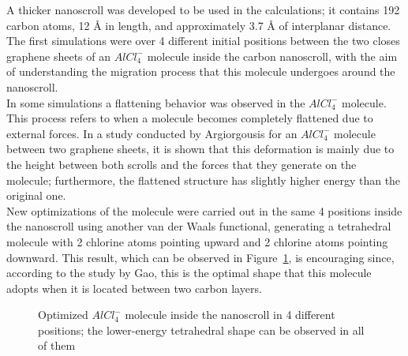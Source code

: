\documentclass[aps,twocolumn,secnumarabic,nobalancelastpage,amsmath,amssymb,
nofootinbib,floatfix]{revtex4}
\begin{document}
A thicker nanoscroll was developed to be used in the calculations; it contains 192 carbon atoms, 12 Å in length, and approximately 3.7 Å of interplanar distance.\\
The first simulations were over 4 different initial positions between the two closes graphene sheets of an \(AlCl_{4}^{-}\) molecule inside the carbon nanoscroll, with the aim of understanding the migration process that this molecule undergoes around the nanoscroll.\\ 
In some simulations a flattening behavior was observed in the \(AlCl_{4}^{-}\) molecule. This process refers to when a molecule becomes completely flattened due to external forces. In a study conducted by Argiorgousis \cite{agiorgousis2017role} for an \(AlCl_{4}^{-}\) molecule between two graphene sheets, it is shown that this deformation is mainly due to the height between both scrolls and the forces that they generate on the molecule; furthermore, the flattened structure has slightly higher energy than the original one.\\
New optimizations of the molecule were carried out in the same 4 positions inside the nanoscroll using another van der Waals functional, generating a tetrahedral molecule with 2 chlorine atoms pointing upward and 2 chlorine atoms pointing downward. This result, which can be observed in Figure~\ref{1}, is encouraging since, according to the study by Gao\cite{gao2017understanding}, this is the optimal shape that this molecule adopts when it is located between two carbon layers.\\

\begin{figure}[htbp]
\centering
\caption{Optimized \(AlCl_{4}^{-}\) molecule inside the nanoscroll in 4 different positions; the lower-energy tetrahedral shape can be observed in all of them}
\label{1}
\end{figure}
\end{document}
